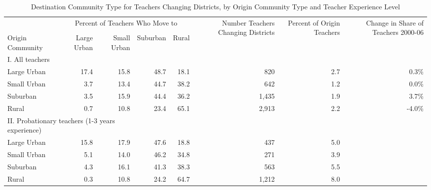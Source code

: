 \documentclass[12pt,]{article}
\begin{document}
\begin{sidewaystable}[htbp]
\centering
\begin{tabular}{lrrrrrrr}
  \hline
 & \multicolumn{4}{c}{\multirow{2}{*}{Percent of Teachers Who Move to}} & \multirow{4}{*}{\parbox{0.09\linewidth}{Number Teachers Changing Districts}} & \multirow{4}{*}{\parbox{0.07\linewidth}{Percent of Origin Teachers}} & \multirow{4}{*}{\parbox{0.09\linewidth}{Change in Share of Teachers 2000-06}}\\
 & \multicolumn{4}{c}{} & & & \\ \cline{2-5}
& & & & & & & \\
Origin Community & Large Urban & Small Urban & Suburban & Rural &  &  &  \\ 
  \hline
I. All teachers & & & & & & & \\
\quad Large Urban & 17.4 & 15.8 & 48.7 & 18.1 & 820 & 2.7 & 0.3\% \\ 
  \quad Small Urban & 3.7 & 13.4 & 44.7 & 38.2 & 642 & 1.2 & 0.0\% \\ 
  \quad Suburban & 3.5 & 15.9 & 44.4 & 36.2 & 1,435 & 1.9 & 3.7\% \\ 
  \quad Rural & 0.7 & 10.8 & 23.4 & 65.1 & 2,913 & 2.2 & -4.0\% \\ 
\multicolumn{3}{l}{II. Probationary teachers (1-3 years experience)} & & & & & \\
  \quad Large Urban & 15.8 & 17.9 & 47.6 & 18.8 & 437 & 5.0 &  \\ 
  \quad Small Urban & 5.1 & 14.0 & 46.2 & 34.8 & 271 & 3.9 &  \\ 
  \quad Suburban & 4.3 & 16.1 & 41.3 & 38.3 & 563 & 5.5 &  \\ 
  \quad Rural & 0.3 & 10.8 & 24.2 & 64.7 & 1,212 & 8.0 &  \\ 
   \hline
\end{tabular}
\caption{Destination Community Type for Teachers Changing Districts, by Origin Community Type and Teacher Experience Level} 
\label{tbl:markov}
\end{sidewaystable}
\end{document}
